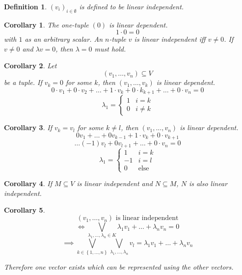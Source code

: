 \documentclass[a4paper,landscape,twocolumn]{article}
\newcommand\set[1]{\left\{#1\right\}}
\newtheorem{defi}{Definition}[section]
\newtheorem{cor}{Corollary}[section]
\begin{document}
\begin{defi}
  $(v_i)_{i \in \emptyset}$ is defined to be linear independent.
\end{defi}

\begin{cor}
  The one-tuple $(0)$ is linear dependent.
  \[ 1 \cdot 0 = 0 \]
  with $1$ as an arbitrary scalar.
  An $n$-tuple $v$ is linear independent iff $v \neq 0$.
  If $v \neq 0$ and $\lambda v = 0$, then $\lambda = 0$ must hold.
\end{cor}

\begin{cor}
  Let
  \[ (v_1, \ldots, v_n) \subseteq V \]
  be a tuple. If $v_k = 0$ for some $k$, then $(v_1, \ldots, v_k)$ is linear dependent.
  \[ 0 \cdot v_1 + 0 \cdot v_2 + \ldots + 1 \cdot v_k + 0 \cdot k_{k + 1} + \ldots + 0 \cdot v_n = 0 \]
  \[
      \lambda_1 = \begin{cases}
        1 & i = k \\
        0 & i \neq k
      \end{cases}
  \]
\end{cor}

\begin{cor}
  If $v_k = v_l$ for some $k \neq l$, then $(v_1, \ldots, v_n)$ is linear dependent.
  \[ 0 v_1 + \ldots + 0 v_{k - 1} + 1 \cdot v_k + 0 \cdot v_{k+1} \]
  \[  \ldots (-1) v_l + 0 v_{l+1} + \ldots + 0 \cdot v_n = 0 \]
  \[
    \lambda_1 = \begin{cases}
      1  & i = k \\
      -1 & i = l \\
      0  & \text{else}
    \end{cases}
  \]
\end{cor}

\begin{cor}
  If $M \subseteq V$ is linear independent and $N \subseteq M$,
  $N$ is also linear independent.
\end{cor}

\begin{cor}
  \[ (v_1, \ldots, v_n) \text{ is linear independent} \]
  \[ \iff \bigvee_{\lambda_1, \ldots, \lambda_n \in K} \lambda_1 v_1 + \ldots + \lambda_n v_n = 0 \]
  \[ \implies \bigvee_{k \in \set{1, \ldots, n}} \bigvee_{\lambda_1, \ldots, \lambda_n} v_l = \lambda_1 v_1 + \ldots + \lambda_n v_n \]

  Therefore one vector exists which can be represented using the other vectors.
\end{cor}
\end{document}
